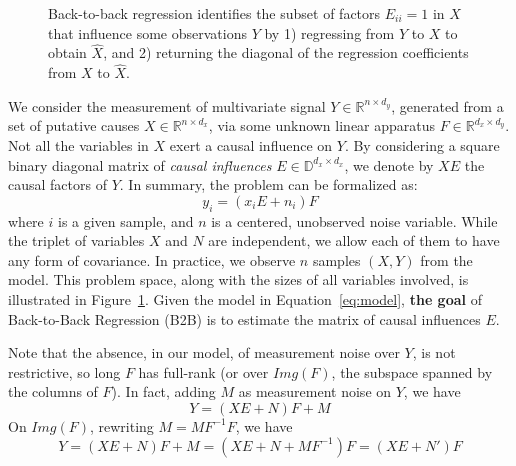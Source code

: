 \documentclass{article}
\begin{document}
\begin{figure}[t!]
    \caption{Back-to-back regression identifies the subset of factors $E_{ii} = 1$ in $X$ that influence some observations $Y$ by 1) regressing from $Y$ to $X$ to obtain $\hat{X}$, and 2) returning the diagonal of the regression coefficients from $X$ to $\hat{X}$.}
    \label{fig:b2b}
\end{figure}

We consider the measurement of multivariate signal $Y \in \mathbb{R}^{n \times d_y}$, generated from a set of putative causes $X \in \mathbb{R}^{n \times d_x}$, via some unknown linear apparatus $F \in \mathbb{R}^{d_x \times d_y}$.
%
Not all the variables in $X$ exert a causal influence on $Y$.
%
By considering a square binary diagonal matrix of \emph{causal influences} $E \in \mathbb{D}^{d_x \times d_x}$, we denote by $XE$ the causal factors of $Y$.
%
In summary, the problem can be formalized as:
%
\begin{equation}
    y_i = (x_i E + n_i) F
    \label{eq:model}
\end{equation}
%
where $i$ is a given sample, and $n$ is a centered, unobserved noise variable.
%
While the triplet of variables $X$ and $N$ are independent, we allow each of them to have any form of covariance.
%
In practice, we observe $n$ samples $(X, Y)$ from the model.
%
This problem space, along with the sizes of all variables involved, is illustrated in Figure~\ref{fig:b2b}.
%
Given the model in Equation~\eqref{eq:model}, \textbf{the goal} of Back-to-Back Regression (B2B) is to estimate the matrix of causal influences $E$.

Note that the absence, in our model, of measurement noise over $Y$, is not restrictive, so long $F$ has full-rank (or over $Img(F)$, the subspace spanned by the columns of $F$). In fact, adding $M$ as measurement noise on $Y$, we have $$Y=(XE+N)F+M$$ On $Img(F)$,
rewriting $M = MF^{-1}F$, we have
$$Y = (XE+N)F+M = (XE+N+MF^{-1})F = (XE+N')F$$
\end{document}
